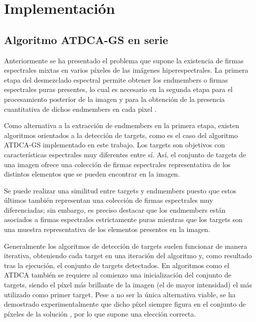 \cleardoublepage
\mbox{}

\chapter{Implementación}
\label{ch:chapter4}


\section{Algoritmo ATDCA-GS en serie}

Anteriormente se ha presentado el problema que supone la existencia de firmas espectrales mixtas en varios píxeles de las imágenes hiperespectrales. La primera etapa del desmezclado espectral permite obtener los endmembers o firmas espectrales puras presentes, lo cual es necesario en la segunda etapa para el procesamiento posterior de la imagen y para la obtención de la presencia cuantitativa de dichos endmembers en cada pixel \cite{biblio:Spectral_unmixing_via}.

Como alternativa a la extracción de endmembers en la primera etapa, existen algoritmos orientados a la detección de targets, como es el caso del algoritmo ATDCA-GS implementado en este trabajo. Los targets son objetivos con características espectrales muy diferentes entre sí. Así, el conjunto de targets de una imagen ofrece una colección de firmas espectrales representativa de los distintos elementos que se pueden encontrar en la imagen.

Se puede realizar una similitud entre targets y endmembers puesto que estos últimos también representan una colección de firmas espectrales muy diferenciadas; sin embargo, es preciso destacar que los endmembers están asociados a firmas espectrales estrictamente puras mientras que los targets son una muestra representativa de los elementos presentes en la imagen.

Generalmente los algoritmos de detección de targets suelen funcionar de manera iterativa, obteniendo cada target en una iteración del algoritmo y, como resultado tras la ejecución, el conjunto de targets detectados. En algoritmos como el ATDCA también se requiere al comienzo una inicialización del conjunto de targets, siendo el píxel más brillante de la imagen (el de mayor intensidad) el más utilizado como primer target. Pese a no ser la única alternativa viable, se ha demostrado experimentalmente que dicho píxel siempre figura en el conjunto de píxeles de la solución \cite{biblio:y}, por lo que supone una elección correcta.

